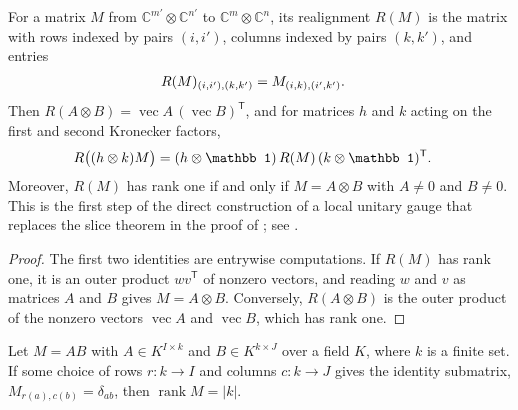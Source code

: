 \begin{lemma}
    \label{lem:matrix_realignment_kronecker}
    \leanok
    For a matrix $M$ from $\mathbb C^{m'}\otimes\mathbb C^{n'}$ to
    $\mathbb C^{m}\otimes\mathbb C^{n}$, its realignment $R(M)$ is the matrix
    with rows indexed by pairs $(i,i')$, columns indexed by pairs $(k,k')$,
    and entries
    \begin{align}
        R(M)_{(i,i'),(k,k')} & =M_{(i,k),(i',k')}.
        \notag
    \end{align}
    Then $R(A\otimes B)=\operatorname{vec}A\,(\operatorname{vec}B)^{\mathsf T}$,
    and for matrices $h$ and $k$ acting on the first and second Kronecker
    factors,
    \begin{align}
        R\bigl((h\otimes k)M\bigr) & =(h\otimes\mathbb 1)\,R(M)\,
                                                                (k\otimes\mathbb 1)^{\mathsf T}.
        \notag
    \end{align}
    Moreover, $R(M)$ has rank one if and only if $M=A\otimes B$ with
    $A\neq0$ and $B\neq0$. This is the first step of the direct construction
    of a local unitary gauge that replaces the slice theorem in the proof of
    \cite[Corollary~IV.7]{Cirac2017MPU}; see
    \cite{gap:mpu_standard_form_path_cross_section}.
\end{lemma}

\begin{proof}\leanok
    The first two identities are entrywise computations. If $R(M)$ has rank
    one, it is an outer product $wv^{\mathsf T}$ of nonzero vectors, and
    reading $w$ and $v$ as matrices $A$ and $B$ gives $M=A\otimes B$.
    Conversely, $R(A\otimes B)$ is the outer product of the nonzero vectors
    $\operatorname{vec}A$ and $\operatorname{vec}B$, which has rank one.
\end{proof}

\begin{lemma}
    \label{lem:matrix_rank_of_factor_identity_minor}
    \leanok
    Let $M=AB$ with $A\in K^{I\times k}$ and $B\in K^{k\times J}$ over a
    field $K$, where $k$ is a finite set. If some choice of rows
    $r\colon k\to I$ and columns $c\colon k\to J$ gives the identity
    submatrix, $M_{r(a),c(b)}=\delta_{ab}$, then $\operatorname{rank}M=|k|$.
\end{lemma}

